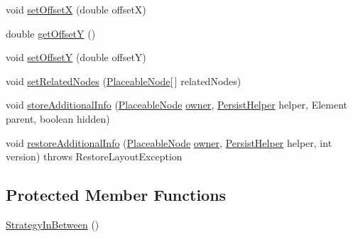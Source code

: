\begin{DoxyCompactItemize}
\item 
void \hyperlink{classorg_1_1tzi_1_1use_1_1gui_1_1views_1_1diagrams_1_1elements_1_1positioning_1_1_strategy_in_between_a449bce24a6c3c198dea6b68aa39b31b0}{set\-Offset\-X} (double offset\-X)
\item 
double \hyperlink{classorg_1_1tzi_1_1use_1_1gui_1_1views_1_1diagrams_1_1elements_1_1positioning_1_1_strategy_in_between_ab62ecf1cf36755988894aea81b65bd40}{get\-Offset\-Y} ()
\item 
void \hyperlink{classorg_1_1tzi_1_1use_1_1gui_1_1views_1_1diagrams_1_1elements_1_1positioning_1_1_strategy_in_between_a7b9be61c88d5e08f22c940917e705bbf}{set\-Offset\-Y} (double offset\-Y)
\item 
void \hyperlink{classorg_1_1tzi_1_1use_1_1gui_1_1views_1_1diagrams_1_1elements_1_1positioning_1_1_strategy_in_between_ae058ed93f3f67c705c9f073c5d888f4e}{set\-Related\-Nodes} (\hyperlink{classorg_1_1tzi_1_1use_1_1gui_1_1views_1_1diagrams_1_1elements_1_1_placeable_node}{Placeable\-Node}\mbox{[}$\,$\mbox{]} related\-Nodes)
\item 
void \hyperlink{classorg_1_1tzi_1_1use_1_1gui_1_1views_1_1diagrams_1_1elements_1_1positioning_1_1_strategy_in_between_a75e03d00994442a942381dc43eae05e8}{store\-Additional\-Info} (\hyperlink{classorg_1_1tzi_1_1use_1_1gui_1_1views_1_1diagrams_1_1elements_1_1_placeable_node}{Placeable\-Node} \hyperlink{classorg_1_1tzi_1_1use_1_1gui_1_1views_1_1diagrams_1_1elements_1_1positioning_1_1_statefull_position_strategy_ac987ea0c7e5b6ddc09cc5afb41043dfd}{owner}, \hyperlink{classorg_1_1tzi_1_1use_1_1gui_1_1util_1_1_persist_helper}{Persist\-Helper} helper, Element parent, boolean hidden)
\item 
void \hyperlink{classorg_1_1tzi_1_1use_1_1gui_1_1views_1_1diagrams_1_1elements_1_1positioning_1_1_strategy_in_between_a6b863f3d97ec32bf7c60e4f4a2c715b2}{restore\-Additional\-Info} (\hyperlink{classorg_1_1tzi_1_1use_1_1gui_1_1views_1_1diagrams_1_1elements_1_1_placeable_node}{Placeable\-Node} \hyperlink{classorg_1_1tzi_1_1use_1_1gui_1_1views_1_1diagrams_1_1elements_1_1positioning_1_1_statefull_position_strategy_ac987ea0c7e5b6ddc09cc5afb41043dfd}{owner}, \hyperlink{classorg_1_1tzi_1_1use_1_1gui_1_1util_1_1_persist_helper}{Persist\-Helper} helper, int version)  throws Restore\-Layout\-Exception 
\end{DoxyCompactItemize}
\subsection*{Protected Member Functions}
\begin{DoxyCompactItemize}
\item 
\hyperlink{classorg_1_1tzi_1_1use_1_1gui_1_1views_1_1diagrams_1_1elements_1_1positioning_1_1_strategy_in_between_ac1609907d0cfd99dd136d56fdea37301}{Strategy\-In\-Between} ()
\end{DoxyCompactItemize}
